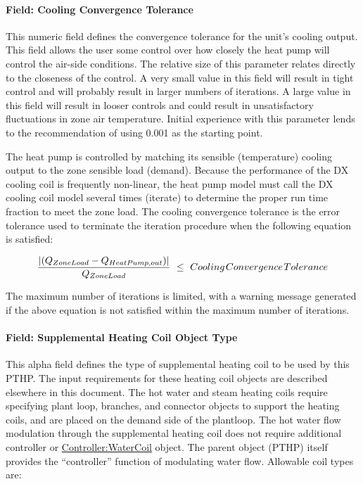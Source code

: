 \paragraph{Field: Cooling Convergence Tolerance}\label{field-cooling-convergence-tolerance-3}

This numeric field defines the convergence tolerance for the unit's cooling output. This field allows the user some control over how closely the heat pump will control the air-side conditions. The relative size of this parameter relates directly to the closeness of the control. A very small value in this field will result in tight control and will probably result in larger numbers of iterations. A large value in this field will result in looser controls and could result in unsatisfactory fluctuations in zone air temperature. Initial experience with this parameter lends to the recommendation of using 0.001 as the starting point.

The heat pump is controlled by matching its sensible (temperature) cooling output to the zone sensible load (demand). Because the performance of the DX cooling coil is frequently non-linear, the heat pump model must call the DX cooling coil model several times (iterate) to determine the proper run time fraction to meet the zone load. The cooling convergence tolerance is the error tolerance used to terminate the iteration procedure when the following equation is satisfied:

\begin{equation}
\frac{{\left| {({Q_{ZoneLoad}} - {Q_{HeatPump,out}})} \right|}}{{{Q_{ZoneLoad}}}}\,\, \le \,\,Cooling{\kern 1pt} Convergence{\kern 1pt} Tolerance
\end{equation}

The maximum number of iterations is limited, with a warning message generated if the above equation is not satisfied within the maximum number of iterations.

\paragraph{Field: Supplemental Heating Coil Object Type}\label{field-supplemental-heating-coil-object-type-000}

This alpha field defines the type of supplemental heating coil to be used by this PTHP. The input requirements for these heating coil objects are described elsewhere in this document. The hot water and steam heating coils require specifying plant loop, branches, and connector objects to support the heating coils, and are placed on the demand side of the plantloop. The hot water flow modulation through the supplemental heating coil does not require additional controller or \hyperref[controllerwatercoil]{Controller:WaterCoil} object. The parent object (PTHP) itself provides the ``controller'' function of modulating water flow. Allowable coil types are:

